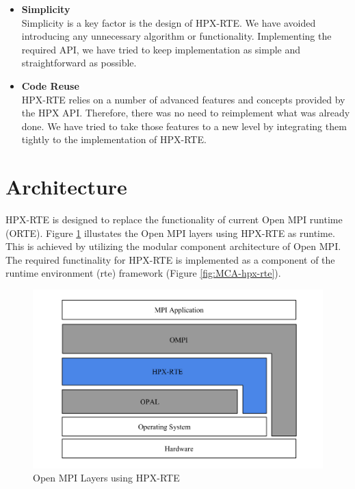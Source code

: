 \begin{itemize}
\item \textbf{Simplicity}\\
  Simplicity is a key factor is the design of HPX-RTE. We have avoided introducing any unnecessary algorithm or functionality. Implementing the required API, we have tried to keep implementation as simple and straightforward as possible.

\item \textbf{Code Reuse}\\
  HPX-RTE relies on a number of advanced features and concepts provided by the HPX API. Therefore, there was no need to reimplement what was already done. We have tried to take those features to a new level by integrating them tightly to the implementation of HPX-RTE.

\end{itemize}

\section{Architecture}
\label{sec:architecture}

HPX-RTE is designed to replace the functionality of current Open MPI runtime (ORTE). Figure \ref{fig:open-mpi-layers-hpx-rte} illustates the Open MPI layers using HPX-RTE as runtime. This is achieved by utilizing the modular component architecture of Open MPI. The required functinality for HPX-RTE is implemented as a component of the runtime environment (rte) framework (Figure \ref{fig:MCA-hpx-rte}).

\begin{figure}[ht]
\centering
\includegraphics[scale=0.45]{images/open-mpi-layers-hpx-rte.png}
\caption[Open MPI Layers using HPX-RTE]{Open MPI Layers using HPX-RTE}
\label{fig:open-mpi-layers-hpx-rte}
\end{figure}

